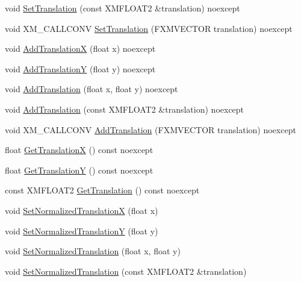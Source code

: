 \begin{DoxyCompactItemize}
\item 
void \hyperlink{structmage_1_1_sprite_transform_ad5429c09032b52459ac1840ad07290f4}{Set\+Translation} (const X\+M\+F\+L\+O\+A\+T2 \&translation) noexcept
\item 
void X\+M\+\_\+\+C\+A\+L\+L\+C\+O\+NV \hyperlink{structmage_1_1_sprite_transform_a597ef325d25183a969915be48d0a99f7}{Set\+Translation} (F\+X\+M\+V\+E\+C\+T\+OR translation) noexcept
\item 
void \hyperlink{structmage_1_1_sprite_transform_aaef393cbf9487650b363458fdb25634d}{Add\+TranslationX} (float x) noexcept
\item 
void \hyperlink{structmage_1_1_sprite_transform_a597921469864d48d612eaba122ba4dd1}{Add\+TranslationY} (float y) noexcept
\item 
void \hyperlink{structmage_1_1_sprite_transform_a9281073dc5327f8f81cc7a112a696491}{Add\+Translation} (float x, float y) noexcept
\item 
void \hyperlink{structmage_1_1_sprite_transform_a257e6a9e0d7762963813c00c8ba2517c}{Add\+Translation} (const X\+M\+F\+L\+O\+A\+T2 \&translation) noexcept
\item 
void X\+M\+\_\+\+C\+A\+L\+L\+C\+O\+NV \hyperlink{structmage_1_1_sprite_transform_a38ce964e75aca33eac312a995d142495}{Add\+Translation} (F\+X\+M\+V\+E\+C\+T\+OR translation) noexcept
\item 
float \hyperlink{structmage_1_1_sprite_transform_a463d0a34f446f69b7ed505943e7e0532}{Get\+TranslationX} () const noexcept
\item 
float \hyperlink{structmage_1_1_sprite_transform_ac38e744ac2a44e3aef7594c68232c6be}{Get\+TranslationY} () const noexcept
\item 
const X\+M\+F\+L\+O\+A\+T2 \hyperlink{structmage_1_1_sprite_transform_ae8103fdc37f52d294d3703709949a30c}{Get\+Translation} () const noexcept
\item 
void \hyperlink{structmage_1_1_sprite_transform_abe257791a06801a7f4aa34f0e83acfea}{Set\+Normalized\+TranslationX} (float x)
\item 
void \hyperlink{structmage_1_1_sprite_transform_aa50268eff50bac9903f1cd2123260f6d}{Set\+Normalized\+TranslationY} (float y)
\item 
void \hyperlink{structmage_1_1_sprite_transform_a9e3af52cdf0dd69346f87d2237c61d54}{Set\+Normalized\+Translation} (float x, float y)
\item 
void \hyperlink{structmage_1_1_sprite_transform_a2718ece51fa0cdd839620df93ac49ff1}{Set\+Normalized\+Translation} (const X\+M\+F\+L\+O\+A\+T2 \&translation)

\end{DoxyCompactItemize}
